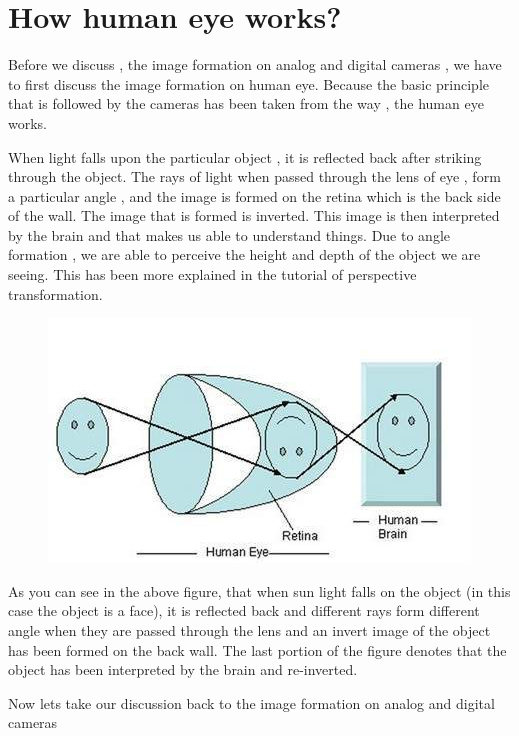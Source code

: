 \documentclass[a4paper]{article}
\begin{document}
 \section{How human eye works?
}
   Before we discuss , the image formation on analog and digital cameras , we have to first discuss the image formation on human eye. Because the basic principle that is followed by the cameras has been taken from the way , the human eye works.

When light falls upon the particular object , it is reflected back after striking through the object. The rays of light when passed through the lens of eye , form a particular angle , and the image is formed on the retina which is the back side of the wall. The image that is formed is inverted. This image is then interpreted by the brain and that makes us able to understand things. Due to angle formation , we are able to perceive the height and depth of the object we are seeing. This has been more explained in the tutorial of perspective transformation.
\begin{figure}[h]
\centering
\includegraphics{dd}
\end{figure}
As you can see in the above figure, that when sun light falls on the object (in this case the object is a face), it is reflected back and different rays form different angle when they are passed through the lens and an invert image of the object has been formed on the back wall. The last portion of the figure denotes that the object has been interpreted by the brain and re-inverted.

Now lets take our discussion back to the image formation on analog and digital cameras
\newpage
\end{document}

